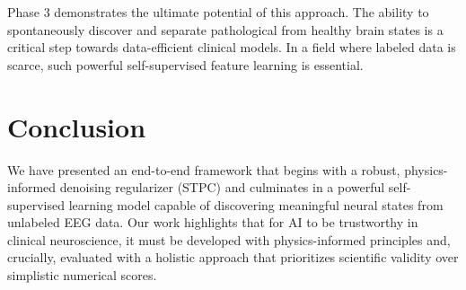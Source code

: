 \documentclass[11pt, a4paper]{article}
\begin{document}
Phase 3 demonstrates the ultimate potential of this approach. The ability to spontaneously discover and separate pathological from healthy brain states is a critical step towards data-efficient clinical models. In a field where labeled data is scarce, such powerful self-supervised feature learning is essential.

\section{Conclusion}
We have presented an end-to-end framework that begins with a robust, physics-informed denoising regularizer (STPC) and culminates in a powerful self-supervised learning model capable of discovering meaningful neural states from unlabeled EEG data. Our work highlights that for AI to be trustworthy in clinical neuroscience, it must be developed with physics-informed principles and, crucially, evaluated with a holistic approach that prioritizes scientific validity over simplistic numerical scores.

\printbibliography

\end{document}
